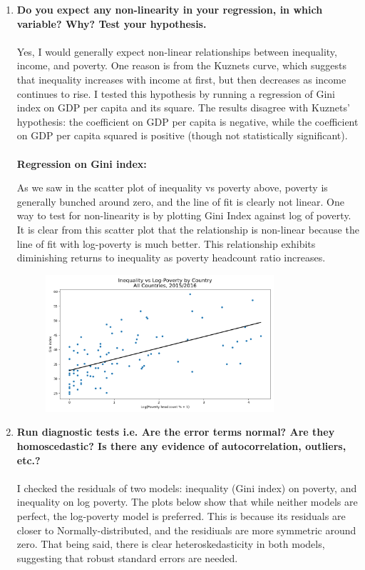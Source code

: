 \documentclass[12pt]{article}
\begin{document}
\begin{enumerate}
    \item \textbf{Do you expect any non-linearity in your regression, in which variable? Why? Test your hypothesis.}
    \\\\
    Yes, I would generally expect non-linear relationships between inequality, income, and poverty. One reason is from the Kuznets curve, which suggests that inequality increases with income at first, but then decreases as income continues to rise. I tested this hypothesis by running a regression of Gini index on GDP per capita and its square. The results disagree with Kuznets' hypothesis: the coefficient on GDP per capita is negative, while the coefficient on GDP per capita squared is positive (though not statistically significant).
    \\\\
    \textbf{Regression on Gini index:}
    \footnotesize
    
    \normalsize
    As we saw in the scatter plot of inequality vs poverty above, poverty is generally bunched around zero, and the line of fit is clearly not linear. One way to test for non-linearity is by plotting Gini Index against log of poverty. It is clear from this scatter plot that the relationship is non-linear because the line of fit with log-poverty is much better. This relationship exhibits diminishing returns to inequality as poverty headcount ratio increases.
    \begin{figure}[H]
        \centering
        \includegraphics[width=0.8\textwidth]{./output/Scatterplot Inequality vs Log-Poverty.png}
    \end{figure}

    \item \textbf{Run diagnostic tests i.e. Are the error terms normal? Are they homoscedastic? Is there any evidence of autocorrelation, outliers, etc.?}
    \\\\
    I checked the residuals of two models: inequality (Gini index) on poverty, and inequality on log poverty. The plots below show that while neither models are perfect, the log-poverty model is preferred. This is because its residuals are closer to Normally-distributed, and the residiuals are more symmetric around zero. That being said, there is clear heteroskedasticity in both models, suggesting that robust standard errors are needed.
    

\end{enumerate}
\end{document}
